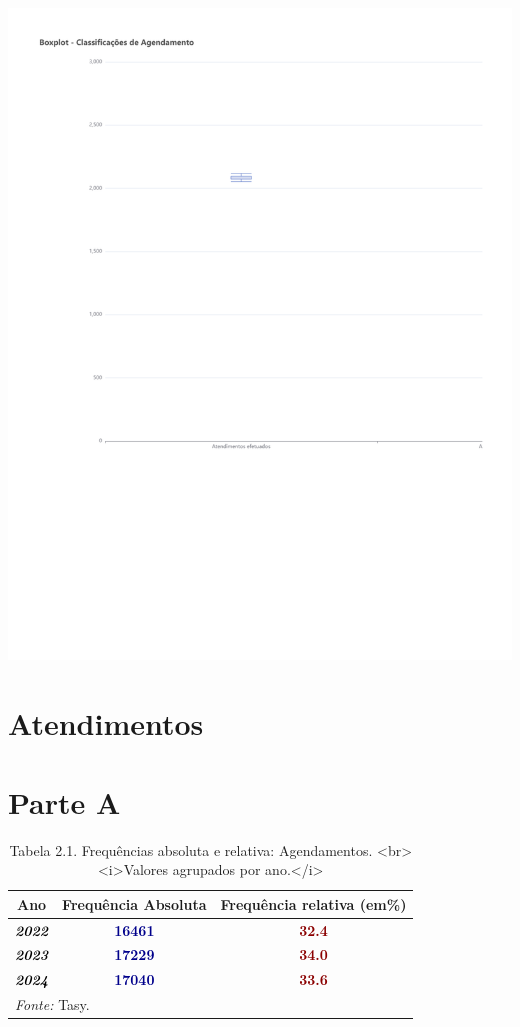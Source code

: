 \documentclass[
  letterpaper,
  DIV=11,
  numbers=noendperiod]{scrreprt}
\begin{document}
\includegraphics{intro_files/figure-pdf/unnamed-chunk-5-1.pdf}

\hypertarget{atendimentos-4}{%
\section*{Atendimentos}\label{atendimentos-4}}


\section{Parte A}

\begin{table}
\centering
\caption{Tabela 2.1. Frequências absoluta e relativa: Agendamentos. <br><i>Valores agrupados por ano.</i>}
\centering
\begin{tabular}[t]{>{}c|>{}c|>{}c}
\hline
Ano & Frequência Absoluta & Frequência relativa (em\%)\\
\hline
\textcolor{black}{\em{\textbf{2022}}} & \textcolor{darkblue}{\textbf{16461}} & \textcolor{darkred}{\textbf{32.4}}\\
\hline
\textcolor{black}{\em{\textbf{2023}}} & \textcolor{darkblue}{\textbf{17229}} & \textcolor{darkred}{\textbf{34.0}}\\
\hline
\textcolor{black}{\em{\textbf{2024}}} & \textcolor{darkblue}{\textbf{17040}} & \textcolor{darkred}{\textbf{33.6}}\\
\hline
\multicolumn{3}{l}{\rule{0pt}{1em}\textit{Fonte: } Tasy.}\\
\end{tabular}
\end{table}
\end{document}
